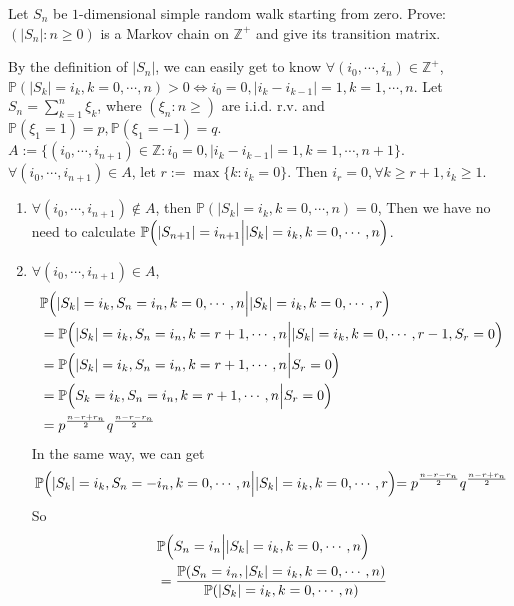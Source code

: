 \documentclass{ctexart}
\begin{document}
\begin{problem}\label{pro:4}
  Let \(S_n\) be \(1\)-dimensional simple random walk starting from zero.
  Prove: \((|S_n|: n \geq 0)\) is a Markov chain on \(\mathbb{Z}^+\) and give its transition matrix.
\end{problem}
\begin{solution}
  By the definition of \(|S_n|\), we can easily get to know
  \(\forall (i_0,\cdots,i_n) \in \mathbb{Z}^{+}\), \(\mathbb{P}(|S_k|=i_k,k=0,\cdots,n)>0 \iff i_0=0,|i_k-i_{k-1}|=1, k=1,\cdots,n\).
  Let \(S_n=\sum_{k=1}^n \xi_k\), where \((\xi_n:n \geq)\) are i.i.d. r.v. and \(\mathbb{P}(\xi_1=1)=p,\mathbb{P}(\xi_1=-1)=q\).
  \(A:=\{(i_0,\cdots,i_{n + 1}) \in \mathbb{Z}: i_0=0,|i_k-i_{k- 1}|=1,k=1,\cdots,n + 1\}\).
  \(\forall (i_0,\cdots,i_{n + 1}) \in A\), let \(r :=\max \{k:i_k=0\}\).
  Then \(i_r=0,\forall k \geq r + 1, i_k \geq 1\).
  \begin{enumerate}
    \item \(\forall (i_0,\cdots,i_{n + 1}) \notin A\), then \(\mathbb{P}(|S_k|=i_k,k=0,\cdots,n) =0\),
      Then we have no need to calculate \(\mathbb{P}\Bigl(|S_{n + 1}|=i_{n + 1} \Bigl|  |S_k|=i_k,k=0,\cdots,n\Bigl)\).
    \item \(\forall(i_0,\cdots,i_{n + 1}) \in A\),
      \[
        \begin{aligned}
           & \mathbb{P}\Bigl(|S_{k}|=i_k,S_n=i_n,k=0,\cdots,n\Bigl|  |S_k|=i_k,k=0,\cdots,r\Bigl)
          \\                   & =\mathbb{P}\Bigl(|S_{k}|=i_k,S_n=i_n,k=r + 1,\cdots,n\Bigl|  |S_k|=i_k,k=0,\cdots,r-1,S_r=0\Bigl)
          \\                   & =\mathbb{P}\Bigl(|S_{k}|=i_k,S_n=i_n,k=r +1,\cdots,n\Bigl|  S_r=0\Bigl)
          \\                   & =\mathbb{P}\Bigl(S_{k}=i_k,S_n=i_n,k=r +1,\cdots,n\Bigl|  S_r=0\Bigl)
          \\&=p^{\frac{n-r + r_n}{2}}q^{\frac{n-r -r_n}{2}}
        \end{aligned}
      \]
      In the same way, we can get
      \[
        \mathbb{P}\Bigl(|S_{k}|=i_k,S_n=-i_n,k=0,\cdots,n\Bigl|  |S_k|=i_k,k=0,\cdots,r\Bigl)=p^{\frac{n-r - r_n}{2}}q^{\frac{n-r +r_n}{2}}
      \]
      So
      \[
        \begin{aligned}
           & \mathbb{P}\Bigl(S_{n}=i_n\Bigl|  |S_k|=i_k,k=0,\cdots,n\Bigl)
          \\                                & =          \frac{\mathbb{P}(S_{n}=i_n,|S_k|=i_k,k=0,\cdots,n)}{\mathbb{P}(|S_k|=i_k,k=0,\cdots,n)}

\end{aligned}\]
\end{enumerate}
\end{solution}
\end{document}
